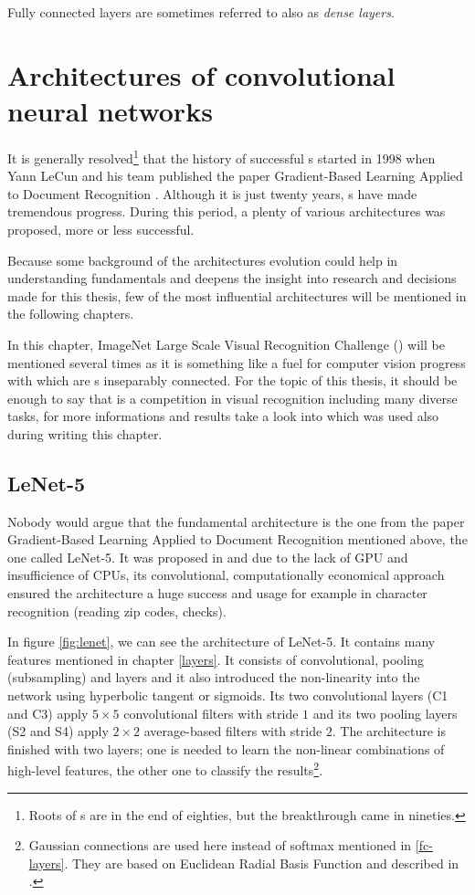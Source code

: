 Fully connected layers are sometimes referred to also as \textit{dense layers}.

\section{Architectures of convolutional neural networks}
\label{cnn-architectures}

It is generally resolved\footnote{Roots of s are in the end of eighties, 
but the breakthrough came in nineties.} that the history of successful s 
started in 1998 when Yann LeCun and his team published the paper Gradient-Based 
Learning Applied to Document Recognition \cite{lenet5}. Although it is just 
twenty years, s have made tremendous progress. During this period, a 
plenty of various architectures was proposed, more or less successful.

Because some background of the  architectures evolution could help in 
understanding  fundamentals and deepens the insight into research and 
decisions made for this thesis, few of the most influential architectures will be 
mentioned in the following chapters.

In this chapter, ImageNet Large Scale Visual Recognition Challenge () 
will be mentioned several times as it is something like a fuel for computer 
vision progress with which are s inseparably connected. For the topic of 
this thesis, it should be enough to say that  is a competition in 
visual recognition including many diverse tasks, for more informations and 
results take a look into \cite{ILSVRC} which was used also during writing this 
chapter.

\subsection{LeNet-5} %
\label{lenet}

Nobody would argue that the fundamental architecture is the one from the paper 
Gradient-Based Learning Applied to Document Recognition mentioned above, the one 
called LeNet-5. It was proposed in \cite{lenet5} and due to the lack of GPU and 
insufficience of CPUs, its convolutional, computationally economical approach 
ensured the architecture a huge success and usage for example in character 
recognition (reading zip codes, checks). 

In figure \ref{fig:lenet}, we can see the architecture of LeNet-5. It contains 
many features mentioned in chapter \ref{layers}. It consists of convolutional, 
pooling (subsampling) and  layers and it also introduced the 
non-linearity into the network using hyperbolic tangent or sigmoids. Its two 
convolutional layers (C1 and C3) apply $5 \times 5$ convolutional filters with 
stride $1$ and its two pooling layers (S2 and S4) apply $2 \times 2$ 
average-based filters with stride $2$. The architecture is finished with two 
 layers; one is needed to learn the non-linear combinations of high-level 
features, the other one to classify the results\footnote{Gaussian connections 
are used here instead of softmax mentioned in \ref{fc-layers}. They are based on 
Euclidean Radial Basis Function and described in \cite{lenet5}.}.


